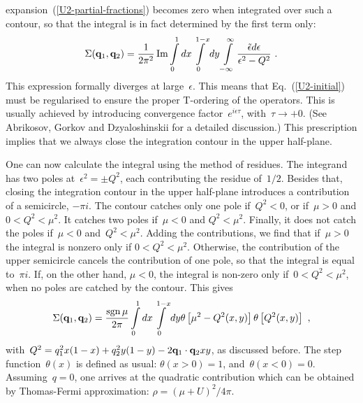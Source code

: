 \documentclass[preprint,aps,prb]{revtex4}
\begin{document}
expansion~(\ref{U2-partial-fractions}) becomes zero when integrated 
over such a contour, so that the integral is in fact determined by the
first term only: 
\begin{equation}
\Sigma({\bf q}_1, {\bf q}_2) 
= \frac{1}{2\pi^2} \mathop{\rm Im}\nolimits
\int\limits_{0}^{1}dx
\int\limits_{0}^{1-x}dy
\int\limits_{-\infty}^{\infty} 
\frac{\tilde\epsilon d\epsilon}{
   \epsilon^2 - Q^2}
\ .
\end{equation}
This expression formally diverges at large~$\epsilon$. This means that
Eq.~(\ref{U2-initial}) must be regularised to ensure the proper
T-ordering of the operators. This is usually achieved by introducing
convergence factor~$e^{i \epsilon\tau}$, with~$\tau \to +0$. (See 
Abrikosov, Gorkov and Dzyaloshinskii for a detailed discussion.)
This prescription implies that we always close the 
integration contour in the upper half-plane. 

One can now calculate
the integral using the method of residues. The integrand has
two poles at~$\epsilon^2 = \pm Q^2$, each contributing the residue of~$1/2$.
Besides that, closing the integration contour in the upper half-plane
introduces a contribution of a semicircle, $-\pi i$. The contour 
catches only  one pole if~$Q^2 < 0$, or if~$\mu > 0$ and $0 < Q^2 < \mu^2$.
It catches two poles if~$\mu < 0$ and $Q^2 < \mu^2$. Finally, it does
not catch the poles if~$\mu < 0$ and~$Q^2 < \mu^2$. 
Adding the contributions, we find that if~$\mu > 0$ the integral is
nonzero only if $0 < Q^2 < \mu^2$. Otherwise, the contribution of the 
upper semicircle cancels the contribution of one pole, so that the 
integral is equal to~$\pi i$. If, on the other hand, $\mu < 0$, 
the integral is non-zero only if~$0 < Q^2 < \mu^2$, when no poles
are catched by the contour. This gives
\begin{equation}
\Sigma({\bf q}_1, {\bf q}_2) 
= \frac{\mathop{\rm sgn}\mu}{2\pi} 
\int\limits_{0}^{1}dx
\int\limits_{0}^{1 - x}dy 
\theta\left[\mu^2 - Q^2(x, y)\right]
\theta\left[Q^2(x, y)\right]
\ , 
\end{equation}
with~$Q^2 = q_1^2 x(1 - x) + q_2^2 y (1 - y)  - 2 {\bf q}_1 \cdot{\bf
q}_2 xy$, as discussed before. 
The step function~$\theta(x)$ is defined as usual: $\theta(x > 0)
= 1$, and~$\theta(x < 0) = 0$. Assuming~$q=0$, one arrives at
the quadratic contribution which can be obtained by Thomas-Fermi
approximation: $\rho = (\mu + U)^2  / 4\pi$.
\end{document}
